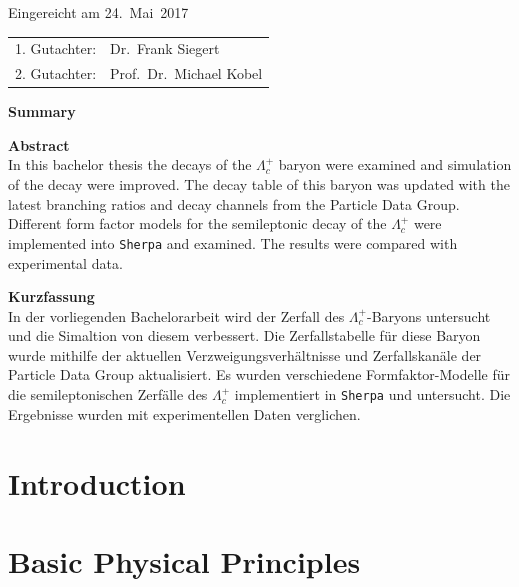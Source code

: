 \thispagestyle{empty}\vspace*{48em}

Eingereicht am 24.~Mai~2017\vspace{1.5em}
\par{\large\begin{tabular}{ll}
 1. Gutachter: & Dr.~Frank Siegert \\
 2. Gutachter: & Prof.~Dr.~Michael Kobel \\
\end{tabular}}


\newpage
\begin{center}\large\bfseries Summary\end{center}


\textbf{Abstract} \\
In this bachelor thesis the decays of the \(\Lambda_c^+\) baryon were examined 
and simulation of the decay were improved. The decay table of this baryon 
was updated with the latest  branching ratios and decay channels from the 
Particle Data Group. Different form factor models for the semileptonic decay 
of the \(\Lambda_c^+\) were implemented into \texttt{Sherpa} and examined.
The results were compared with experimental data. 


\vspace{20em}
\textbf{Kurzfassung} \\ 
In der vorliegenden Bachelorarbeit wird der Zerfall des \(\Lambda_c^+\)-Baryons 
untersucht und die Simaltion von diesem verbessert. Die Zerfallstabelle 
f{\"u}r diese Baryon wurde mithilfe der aktuellen 
Verzweigungsverh{\"a}ltnisse und Zerfallskan{\"a}le der Particle Data Group 
aktualisiert. Es wurden verschiedene Formfaktor-Modelle f{\"u}r die 
semileptonischen Zerf{\"a}lle des \(\Lambda_c^+\) implementiert in \texttt{Sherpa}
und untersucht. Die Ergebnisse wurden mit experimentellen Daten verglichen. 

 
 

\tableofcontents




\chapter{Introduction}

\chapter{Basic Physical Principles}


